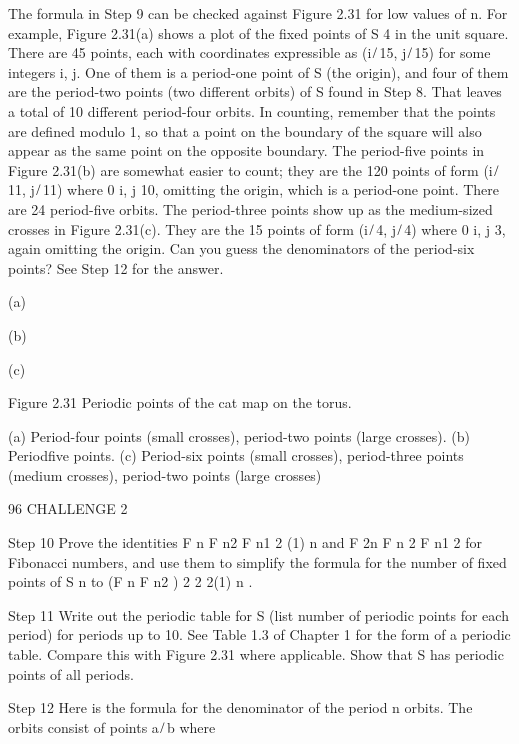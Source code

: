 \documentclass[12pt]{article}
\begin{document}
The formula in Step 9 can be checked against Figure 2.31 for low values of n. For example, Figure 2.31(a) shows a plot of the ﬁxed 
points of S 4 in the unit square. There are 45 points, each with coordinates expressible as (i ̸ 15, j ̸ 15) for some integers i, j. 
One of them is a period-one point of S (the origin), and four of them are the period-two points (two different orbits) of S found in 
Step 8. That leaves a total of 10 different period-four orbits. In counting, remember that the points are deﬁned modulo 1, so that a 
point on the boundary of the square will also appear as the same point on the opposite boundary. The period-ﬁve points in Figure 
2.31(b) are somewhat easier to count; they are the 120 points of form (i ̸ 11, j ̸ 11) where 0 i, j 10, omitting the origin, which is a 
period-one point. There are 24 period-ﬁve orbits. The period-three points show up as the medium-sized crosses in Figure 2.31(c). 
They are the 15 points of form (i ̸ 4, j ̸ 4) where 0 i, j 3, again omitting the origin. Can you guess the denominators of the 
period-six points? See Step 12 for the answer.

(a)

(b)

(c)

Figure 2.31 Periodic points of the cat map on the torus.

(a) Period-four points (small crosses), period-two points (large crosses). (b) Periodﬁve points. (c) Period-six points (small 
crosses), period-three points (medium crosses), period-two points (large crosses)

96 CHALLENGE 2

Step 10 Prove the identities F n F n2  F n1 2  (1) n and F 2n  F n 2  F n1 2 for Fibonacci numbers, and use them to simplify the 
formula for the number of ﬁxed points of S n to (F n  F n2 ) 2  2  2(1) n .

Step 11 Write out the periodic table for S (list number of periodic points for each period) for periods up to 10. See Table 1.3 of 
Chapter 1 for the form of a periodic table. Compare this with Figure 2.31 where applicable. Show that S has periodic points of all 
periods.

Step 12 Here is the formula for the denominator of the period n orbits. The orbits consist of points a ̸ b where
\end{document}
